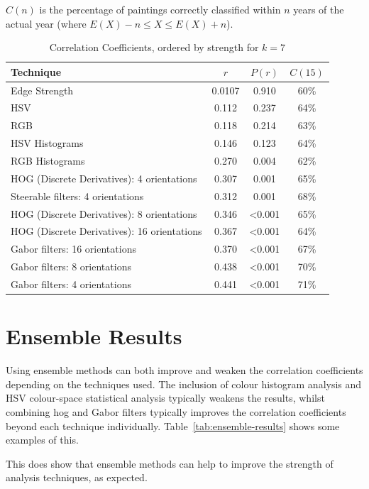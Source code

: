 $C(n)$ is the percentage of paintings correctly classified within $n$ years of the actual year 
(where $E(X)-n \le X \le E(X)+n$).

\begin{table}[h]
\centering
\begin{tabular}{|l|c|c|c|}\hline
Technique     					& $r$    & $P(r)$ & $C(15)$ \\ \hline
Edge Strength 					& 0.0107 & 0.910  & 60\%    \\
HSV 						& 0.112	 & 0.237  & 64\%    \\
RGB 						& 0.118  & 0.214  & 63\%    \\
HSV Histograms					& 0.146	 & 0.123  & 64\%    \\
RGB Histograms					& 0.270	 & 0.004  & 62\%    \\
HOG (Discrete Derivatives): 4 orientations 	& 0.307	 & 0.001  & 65\%    \\
Steerable filters: 4 orientations 		& 0.312	 & 0.001  & 68\%    \\
HOG (Discrete Derivatives): 8 orientations 	& 0.346	 & \textless0.001 & 65\% \\
HOG (Discrete Derivatives): 16 orientations 	& 0.367	 & \textless0.001 & 64\% \\
Gabor filters: 16 orientations			& 0.370  & \textless0.001 & 67\% \\
Gabor filters: 8 orientations			& 0.438	 & \textless0.001 & 70\% \\
Gabor filters: 4 orientations			& 0.441	 & \textless0.001 & 71\% \\
\hline
\end{tabular}
\caption{Correlation Coefficients, ordered by strength for $k=7$}\label{tab:r-results}
\end{table}


\newpage
\section{Ensemble Results}
Using ensemble methods can both improve and weaken the correlation coefficients depending on the
techniques used. The inclusion of colour histogram analysis and HSV colour-space statistical
analysis typically weakens the results, whilst combining \gls{hog} and Gabor filters typically 
improves the correlation coefficients beyond each technique individually. 
Table~\ref{tab:ensemble-results} shows some examples of this.

This does show that ensemble methods can help to improve the strength of analysis techniques, as
expected.

